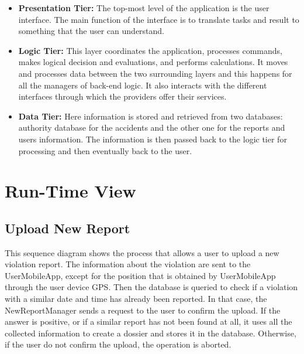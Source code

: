 \documentclass[../RASD.tex]{subfiles}
\begin{document}
    \begin{itemize}
        \item \textbf{Presentation Tier:} The top-most level of the application is the user interface.
        The main function of the interface is to translate tasks and result to something that the user can understand.
        \item \textbf{Logic Tier:} This layer coordinates the application, processes commands, makes logical decision and evaluations, and performs calculations.
        It moves and processes data between the two surrounding layers and this happens for all the managers of back-end logic.
        It also interacts with the different interfaces through which the providers offer their services.
        \item \textbf{Data Tier:} Here information is stored and retrieved from two databases: authority database for the accidents and the other one
        for the reports and users information.
        The information is then passed back to the logic tier for processing and then eventually back to the user.
    \end{itemize}
    \newpage
    \section{Run-Time View}\label{sec:run-time-view}
    \subsection{Upload New Report}\label{subsec:upload-new-report}
    \begin{figure}[H]
    \end{figure}
    This sequence diagram shows the process that allows a user to upload a new violation report.
    The information about the violation are sent to the UserMobileApp, except for the position that is obtained by UserMobileApp through the user device GPS\@.
    Then the database is queried to check if a violation with a similar date and time has already been reported.
    In that case, the NewReportManager sends a request to the user to confirm the upload.
    If the answer is positive, or if a similar report has not been found at all, it uses all the collected information to create a dossier and stores it in the database.
    Otherwise, if the user do not confirm the upload, the operation is aborted.
\end{document}
